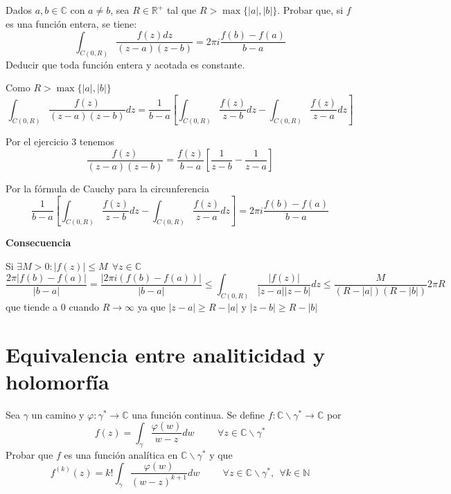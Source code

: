 \begin{ejer}
	Dados $a,b\in\mathbb{C}$ con $a\not =b$, sea $R\in\mathbb{R}^+$ tal que $R>\max \{|a|,|b|\}$. Probar que, si $f$ es una función entera, se tiene:
	$$ \int_{C(0,R)} \frac{f(z)dz}{(z-a)(z-b)} = 2\pi i\frac{f(b)-f(a)}{b-a} $$
	Deducir que toda función entera y acotada es constante.
\end{ejer}
\begin{sol}
	
	Como $R>\max\{ |a|, |b| \}$
	$$\int_{C(0,R)} \frac{f(z)}{(z-a)(z-b)}dz = \frac{1}{b-a} \left[ \int_{C(0,R)} \frac{f(z)}{z-b}dz - \int_{C(0,R)} \frac{f(z)}{z-a}dz \right]$$
	
	Por el ejercicio $3$ tenemos
	$$\frac{f(z)}{(z-a)(z-b)} = \frac{f(z)}{b-a} \left[ \frac{1}{z-b} - \frac{1}{z-a} \right]$$
	
	Por la fórmula de Cauchy para la circunferencia
	$$\frac{1}{b-a} \left[ \int_{C(0,R)} \frac{f(z)}{z-b}dz - \int_{C(0,R)} \frac{f(z)}{z-a}dz \right] = 2\pi i\frac{f(b) - f(a)}{b-a}$$
	
	\textbf{Consecuencia}
	
	Si $\exists M>0 : |f(z)|\leq M\ \ \forall z \in \mathbb{C}$
	$$\frac{2\pi |f(b)-f(a)|}{|b-a|} = \frac{|2\pi i(f(b)-f(a))|}{|b-a|} 
	\leq \int_{C(0,R)} \frac{|f(z)|}{|z-a||z-b|} dz \leq \frac{M}{(R-|a|)(R-|b|)} 2\pi R$$
	que tiende a $0$ cuando $R\rightarrow \infty$ ya que $|z-a|\geq R-|a|$ y $|z-b|\geq R - |b|$
\end{sol}


\newpage



\section{Equivalencia entre analiticidad y holomorfía}
\begin{ejer}
	Sea $\gamma$ un camino y $\varphi : \gamma^{\ast} \rightarrow \mathbb{C}$ una función continua. Se define $f:\mathbb{C}\backslash\gamma^{\ast}\rightarrow\mathbb{C}$ por
	$$ f(z) = \int_{\gamma}\frac{\varphi(w)}{w-z}dw \hspace{1cm} \forall z\in\mathbb{C}\backslash\gamma^{\ast} $$
	Probar que $f$ es una función analítica en $\mathbb{C}\backslash\gamma^{\ast}$ y que
	$$ f^{(k)}(z) = k! \int_{\gamma} \frac{\varphi(w)}{(w-z)^{k+1}}dw \hspace{1cm} \forall z\in\mathbb{C}\backslash\gamma^{\ast}, \ \ \forall k\in\mathbb{N} $$
\end{ejer}

